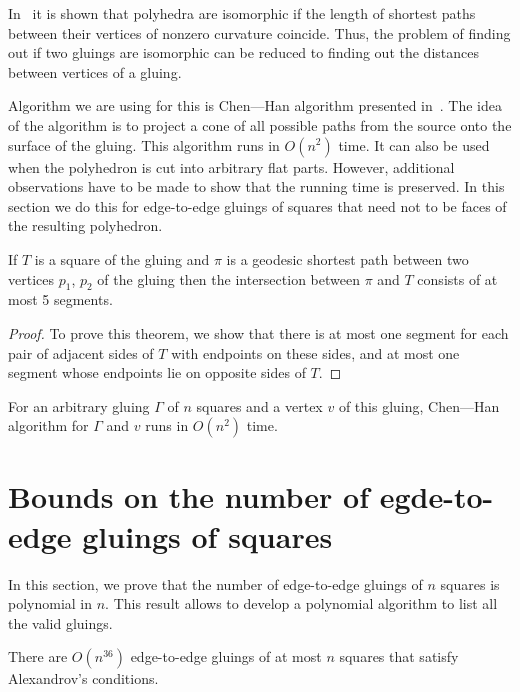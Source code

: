 \documentclass[a4paper,USenglish,cleveref, autoref, thm-restate]{socg-lipics-v2019}
\begin{document}
In~\cite{DO07} it is shown that polyhedra are isomorphic if the length of shortest paths between their vertices of nonzero curvature coincide. Thus, the problem of finding out if two gluings are isomorphic can be reduced to finding out the distances between vertices of a gluing.

Algorithm we are using for this is  Chen—Han algorithm presented in~\cite{chen-han}. The idea of the algorithm is to project a cone of all possible paths from the source onto the surface of the gluing. This algorithm runs in $O(n^2)$ time. It can also be used when the polyhedron is cut into arbitrary flat parts. However, additional observations have to be made to show that the running time is preserved. In this section we do this for edge-to-edge gluings of squares that need not to be faces of the resulting polyhedron.

\begin{theorem} \label{thm:shortestSquare}
	If $T$ is a square of the gluing and $\pi$ is a geodesic shortest path between two vertices $p_1$, $p_2$ of the gluing then the intersection between $\pi$ and $T$ consists of at most 5 segments.
\end{theorem}

\begin{proof}
	To prove this theorem, we show that there is at most one segment for each pair of adjacent sides of $T$ with endpoints on these sides, and at most one segment whose endpoints lie on opposite sides of $T$.
\end{proof}

\begin{corollary} \label{cor:chruntime}
	For an arbitrary gluing $\Gamma$ of $n$ squares and a vertex $v$ of this gluing, Chen—Han algorithm for $\Gamma$ and $v$ runs in $O(n^2)$ time.
\end{corollary}

\section{Bounds on the number of egde-to-edge gluings of squares}

In this section, we prove that the number of edge-to-edge gluings of $n$ squares is polynomial in $n$. This result allows to develop a polynomial algorithm to list all the valid gluings.

\begin{theorem} \label{thm:n36}
	There are $O \left( n^{36} \right)$ edge-to-edge gluings of at most $n$ squares that satisfy Alexandrov's conditions.
\end{theorem}
\end{document}
